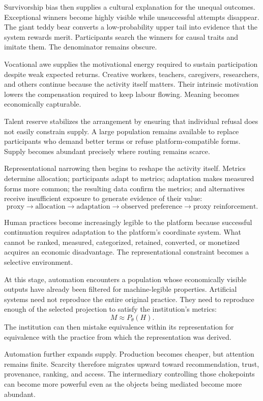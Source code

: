 \documentclass[11pt]{article}
\begin{document}
Survivorship bias then supplies a cultural explanation for the unequal outcomes. Exceptional winners become highly visible while unsuccessful attempts disappear. The giant teddy bear converts a low-probability upper tail into evidence that the system rewards merit. Participants search the winners for causal traits and imitate them. The denominator remains obscure.

Vocational awe supplies the motivational energy required to sustain participation despite weak expected returns. Creative workers, teachers, caregivers, researchers, and others continue because the activity itself matters. Their intrinsic motivation lowers the compensation required to keep labour flowing. Meaning becomes economically capturable.

Talent reserve stabilizes the arrangement by ensuring that individual refusal does not easily constrain supply. A large population remains available to replace participants who demand better terms or refuse platform-compatible forms. Supply becomes abundant precisely where routing remains scarce.

Representational narrowing then begins to reshape the activity itself. Metrics determine allocation; participants adapt to metrics; adaptation makes measured forms more common; the resulting data confirm the metrics; and alternatives receive insufficient exposure to generate evidence of their value:
\[
\text{proxy}
\rightarrow
\text{allocation}
\rightarrow
\text{adaptation}
\rightarrow
\text{observed preference}
\rightarrow
\text{proxy reinforcement}.
\]

Human practices become increasingly legible to the platform because successful continuation requires adaptation to the platform's coordinate system. What cannot be ranked, measured, categorized, retained, converted, or monetized acquires an economic disadvantage. The representational constraint becomes a selective environment.

At this stage, automation encounters a population whose economically visible outputs have already been filtered for machine-legible properties. Artificial systems need not reproduce the entire original practice. They need to reproduce enough of the selected projection to satisfy the institution's metrics:
\[
M \approx P_{\theta}(H).
\]
The institution can then mistake equivalence within its representation for equivalence with the practice from which the representation was derived.

Automation further expands supply. Production becomes cheaper, but attention remains finite. Scarcity therefore migrates upward toward recommendation, trust, provenance, ranking, and access. The intermediary controlling those chokepoints can become more powerful even as the objects being mediated become more abundant.
\end{document}

